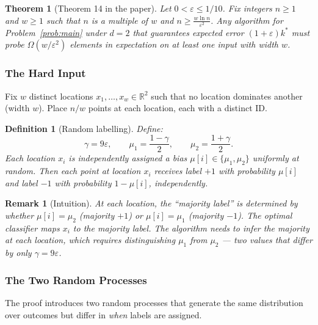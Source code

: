\documentclass[11pt, a4paper]{article}
\theoremstyle{boxed}
\newtheorem{innerdefinition}{Definition}[section]
\newtheorem{innertheorem}{Theorem}[section]
\newtheorem{innerremark}{Remark}[section]
\newenvironment{definition}
  {\begin{mdframed}[style=defstyle]\begin{innerdefinition}}
  {\end{innerdefinition}\end{mdframed}}
\newenvironment{theorem}
  {\begin{mdframed}[style=thmstyle]\begin{innertheorem}}
  {\end{innertheorem}\end{mdframed}}
\newenvironment{remark}
  {\begin{mdframed}[style=notestyle]\begin{innerremark}}
  {\end{innerremark}\end{mdframed}}
\newcommand{\R}{\mathbb{R}}
\newcommand{\kstar}{k^{*}}
\begin{document}
\begin{theorem}[Theorem 14 in the paper]\label{thm:lb-arbitrary}
  Let $0 < \varepsilon \le 1/10$. Fix integers $n \ge 1$ and $w \ge 1$ such that $n$ is a multiple of $w$ and $n \ge \frac{w \ln n}{\varepsilon^2}$. Any algorithm for Problem~\ref{prob:main} under $d = 2$ that guarantees expected error $(1+\varepsilon)\kstar$ must probe $\Omega(w/\varepsilon^2)$ elements in expectation on at least one input with width $w$.
\end{theorem}

\subsubsection{The Hard Input}

Fix $w$ distinct locations $x_1, \ldots, x_w \in \R^2$ such that no location dominates another (width $w$). Place $n/w$ points at each location, each with a distinct ID.

\begin{definition}[Random labelling]
  Define:
  \[
    \gamma = 9\varepsilon, \qquad \mu_1 = \frac{1-\gamma}{2}, \qquad \mu_2 = \frac{1+\gamma}{2}.
  \]
  Each location $x_i$ is independently assigned a bias $\mu[i] \in \{\mu_1, \mu_2\}$ uniformly at random. Then each point at location $x_i$ receives label $+1$ with probability $\mu[i]$ and label $-1$ with probability $1 - \mu[i]$, independently.
\end{definition}

\begin{remark}[Intuition]
  At each location, the ``majority label'' is determined by whether $\mu[i] = \mu_2$ (majority $+1$) or $\mu[i] = \mu_1$ (majority $-1$). The optimal classifier maps $x_i$ to the majority label. The algorithm needs to \emph{infer the majority} at each location, which requires distinguishing $\mu_1$ from $\mu_2$ --- two values that differ by only $\gamma = 9\varepsilon$.
\end{remark}

\subsubsection{The Two Random Processes}

The proof introduces two random processes that generate the same distribution over outcomes but differ in \emph{when} labels are assigned.
\end{document}
